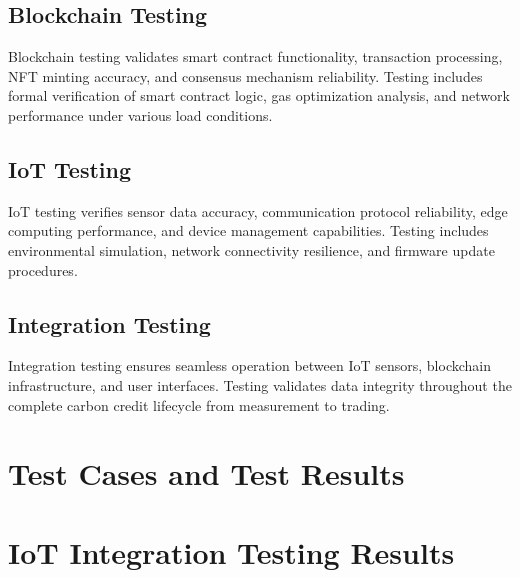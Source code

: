 \documentclass[oneside,a4paper,12pt]{book}
\begin{document}
\subsection{Blockchain Testing}
Blockchain testing validates smart contract functionality, transaction processing, NFT minting accuracy, and consensus mechanism reliability. Testing includes formal verification of smart contract logic, gas optimization analysis, and network performance under various load conditions.

\subsection{IoT Testing}
IoT testing verifies sensor data accuracy, communication protocol reliability, edge computing performance, and device management capabilities. Testing includes environmental simulation, network connectivity resilience, and firmware update procedures.

\subsection{Integration Testing}
Integration testing ensures seamless operation between IoT sensors, blockchain infrastructure, and user interfaces. Testing validates data integrity throughout the complete carbon credit lifecycle from measurement to trading.

\section{Test Cases and Test Results}


\section{IoT Integration Testing Results}
\end{document}
